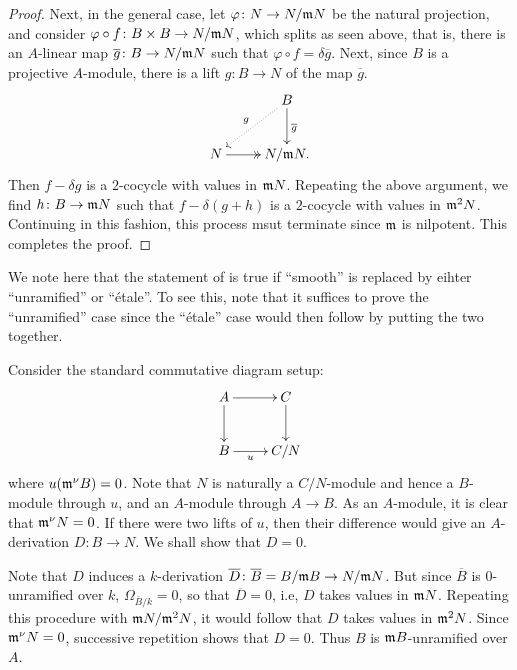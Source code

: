 \begin{proof}
    Next, in the general case, let $\varphi\colon N\to N/\mathfrak{m} N$ be the natural projection, and consider $\varphi\circ f\colon B\times B\to N/\mathfrak{m} N$, which splits as seen above, that is, there is an $A$-linear map $\overline g\colon B\to N/\mathfrak{m} N$ such that $\varphi\circ f = \delta\overline g$. Next, since $B$ is a projective $A$-module, there is a lift $g\colon B\to N$ of the map $\overline g$. 
    \begin{equation*}
        \xymatrix {
            & B\ar[d]^{\overline g}\ar@{.>}[ld]_{g}\\
            N\ar@{->>}[r] & N/\frakm N.
        }
    \end{equation*}
    Then $f - \delta g$ is a $2$-cocycle with values in $\mathfrak{m} N$. Repeating the above argument, we find $h\colon B\to\mathfrak{m} N$ such that $f - \delta(g + h)$ is a $2$-cocycle with values in $\mathfrak{m}^2 N$. Continuing in this fashion, this process msut terminate since $\mathfrak{m}$ is nilpotent. This completes the proof.
\end{proof}

\begin{remark}
    We note here that the statement of  is true if ``smooth'' is replaced by eihter ``unramified'' or ``\'etale''. To see this, note that it suffices to prove the ``unramified'' case since the ``\'etale'' case would then follow by putting the two together.

    Consider the standard commutative diagram setup: 
    \begin{equation*}
        \xymatrix {
            A\ar[r]\ar[d] & C\ar[d]\\
            B\ar[r]_-u & C/N
        }
    \end{equation*}
    where $u(\mathfrak{m}^\nu B) = 0$. Note that $N$ is naturally a $C/N$-module and hence a $B$-module through $u$, and an $A$-module through $A\to B$. As an $A$-module, it is clear that $\mathfrak{m}^\nu N = 0$. If there were two lifts of $u$, then their difference would give an $A$-derivation $D\colon B\to N$. We shall show that $D = 0$. 
    
    Note that $D$ induces a $k$-derivation $\overline D\colon \overline{B} = B/\mathfrak{m} B\to N/\mathfrak{m} N$. But since $\overline B$ is $0$-unramified over $k$, $\Omega_{\overline B/k} = 0$, so that $\overline D = 0$, i.e, $D$ takes values in $\mathfrak{m} N$. Repeating this procedure with $\mathfrak{m} N/\mathfrak{m}^2 N$, it would follow that $D$ takes values in $\mathfrak{m}^2 N$. Since $\mathfrak{m}^\nu N = 0$, successive repetition shows that $D = 0$. Thus $B$ is $\mathfrak{m} B$-unramified over $A$.
\end{remark}

